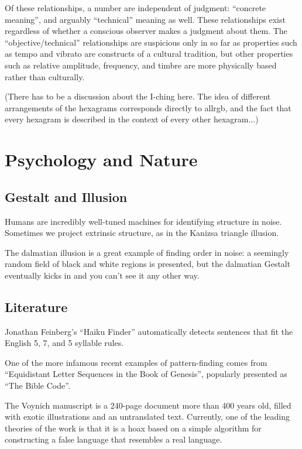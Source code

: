 \documentclass{thesis}
\begin{document}
	Of these relationships, a number are independent of judgment: ``concrete meaning'', and arguably ``technical'' meaning as well. These relationships exist regardless of whether a conscious observer makes a judgment about them. The ``objective/technical'' relationships are suspicious only in so far as properties such as tempo and vibrato are constructs of a cultural tradition, but other properties such as relative amplitude, frequency, and timbre are more physically based rather than culturally.
	
	(There has to be a discussion about the I-ching here. The idea of different arrangements of the hexagrams corresponds directly to allrgb, and the fact that every hexagram is described in the context of every other hexagram...)

\section{Psychology and Nature}

\subsection{Gestalt and Illusion}
	Humans are incredibly well-tuned machines for identifying structure in noise. Sometimes we project extrinsic structure, as in the Kanizsa triangle illusion.\cite{alexander_bogomolny_kanizsa_????}
	
	The dalmatian illusion\cite{michael_bach_dalmatian_2002} is a great example of finding order in noise: a seemingly random field of black and white regions is presented, but the dalmatian Gestalt eventually kicks in and you can't see it any other way.
	
\subsection{Literature}
	Jonathan Feinberg's ``Haiku Finder''\cite{jonathan_feinberg_haiku_????} automatically detects sentences that fit the English 5, 7, and 5 syllable rules.
		
	One of the more infamous recent examples of pattern-finding comes from ``Equidistant Letter Sequences in the Book of Genesis''\cite{rips_equidistant_1994}, popularly presented as ``The Bible Code''.
	
	The Voynich manuscript is a 240-page document more than 400 years old, filled with exotic illustrations and an untranslated text. Currently, one of the leading theories of the work is that it is a hoax based on a simple algorithm for constructing a false language that resembles a real language.\cite{robin_mckie_secret_2004}
		
\end{document}
